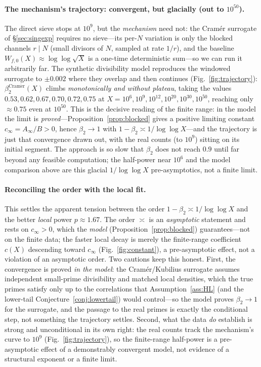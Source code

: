 \documentclass[]{interact}%
\begin{document}
\paragraph{The mechanism's trajectory: convergent, but glacially (out to $10^{50}$).}
The direct sieve stops at $10^9$, but the \emph{mechanism} need not: the Cram\'er surrogate of
\S\ref{sec:singexp} requires no sieve---its per-$N$ variation is only the blocked channels
$r\mid N$ (small divisors of $N$, sampled at rate $1/r$), and the baseline
$W_{f,0}(X)\approx\log\log\sqrt X$ is a one-time deterministic sum---so we can run it arbitrarily
far. The synthetic divisibility model reproduces the windowed surrogate to $\pm0.002$ where they
overlap and then continues (Fig.~\ref{fig:trajectory}): $\beta_2^{\mathrm{Cram\acute er}}(X)$ climbs
\emph{monotonically and without plateau}, taking the values
$0.53,0.62,0.67,0.70,0.72,0.75$ at $X=10^{6},10^{9},10^{12},10^{20},10^{30},10^{50}$, reaching only
$\approx0.75$ even at $10^{50}$. This is the decisive reading of the finite range: in the model the
limit is \emph{proved}---Proposition~\ref{prop:blocked} gives a positive limiting constant
$c_\infty=A_\infty/B>0$, hence $\beta_2\to1$ with $1-\beta_2\asymp1/\log\log X$---and the trajectory
is just that convergence drawn out, with the real counts (to $10^9$) sitting on its initial
segment. The approach is so slow that $\beta_2$ does not reach $0.9$ until far beyond any feasible
computation; the half-power near $10^6$ and the model comparison above are this glacial
$1/\log\log X$ pre-asymptotics, not a finite limit.

\paragraph{Reconciling the order with the local fit.}
This settles the apparent tension between the order $1-\beta_2\asymp1/\log\log X$ and the better
\emph{local} power $p\approx1.67$. The order $\asymp$ is an \emph{asymptotic} statement and rests
on $c_\infty>0$, which the \emph{model} (Proposition~\ref{prop:blocked}) guarantees---not on the
finite data; the faster local decay is merely the finite-range coefficient $c(X)$ descending toward
$c_\infty$ (Fig.~\ref{fig:constant}), a pre-asymptotic effect, not a violation of an asymptotic
order. Two cautions keep this honest. First, the convergence is proved \emph{in the model}: the
Cram\'er/Kubilius surrogate assumes independent small-prime divisibility and matched local
densities, which the true primes satisfy only up to the correlations that Assumption~\ref{ass:HL}
(and the lower-tail Conjecture~\ref{conj:lowertail}) would control---so the model proves
$\beta_2\to1$ for the surrogate, and the passage to the real primes is exactly the conditional
step, not something the trajectory settles. Second, what the data \emph{do} establish is strong
and unconditional in its own right: the real counts track the mechanism's curve to $10^9$
(Fig.~\ref{fig:trajectory}), so the finite-range half-power is a pre-asymptotic effect of a
demonstrably convergent model, not evidence of a structural exponent or a finite limit.
\end{document}
